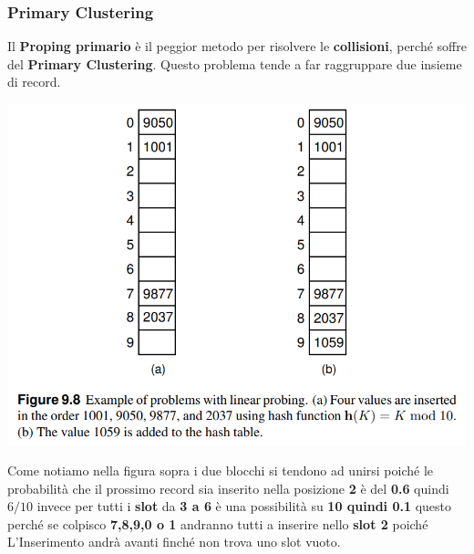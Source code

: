 \subsubsection{Primary Clustering}
Il \textbf{Proping primario} è il peggior metodo per risolvere le \textbf{collisioni}, perché soffre del \textbf{Primary Clustering}. Questo problema tende a far raggruppare due insieme di record. 
\begin{center}
    \includegraphics[scale = 0.36]{Capitoli/HashTable/Esempi/ClusteringPrimario.png}
\end{center}
Come notiamo nella figura sopra i due blocchi  si  tendono ad unirsi poiché le probabilità che il prossimo record sia inserito nella posizione \textbf{2} è del \textbf{0.6} quindi $6/10$ invece per tutti i \textbf{slot} da \textbf{3 a 6} è una possibilità su \textbf{10 quindi 0.1} \newline
questo perché se colpisco \textbf{7,8,9,0 o 1} andranno tutti a inserire nello \textbf{slot 2} poiché L'Inserimento andrà avanti finché non trova uno slot vuoto. 
